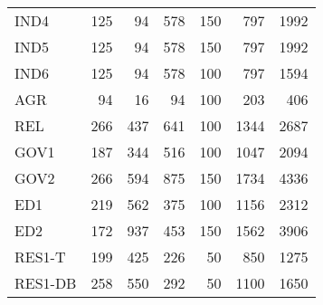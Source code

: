 \begin{tabular}{l|rrr|r|rr}
     IND4  &        125 &         94 &        578 &        150 &        797 &       1992 \\
     IND5  &        125 &         94 &        578 &        150 &        797 &       1992 \\
     IND6  &        125 &         94 &        578 &        100 &        797 &       1594 \\
     AGR   &         94 &         16 &         94 &        100 &        203 &        406 \\
     REL   &        266 &        437 &        641 &        100 &       1344 &       2687 \\
     GOV1  &        187 &        344 &        516 &        100 &       1047 &       2094 \\
     GOV2  &        266 &        594 &        875 &        150 &       1734 &       4336 \\
     ED1   &        219 &        562 &        375 &        100 &       1156 &       2312 \\
     ED2   &        172 &        937 &        453 &        150 &       1562 &       3906 \\
    RES1-T &        199 &        425 &        226 &         50 &        850 &       1275 \\
   RES1-DB &        258 &        550 &        292 &         50 &       1100 &       1650 \\
\hline
\end{tabular}  
